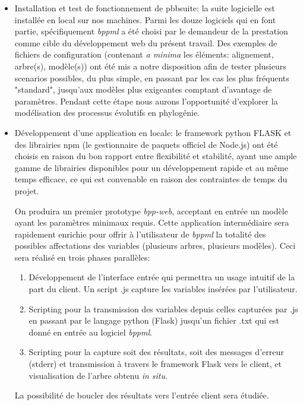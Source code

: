 \begin{itemize}
	\item Installation et test de fonctionnement de pbbsuite: la suite logicielle est installée en local sur nos machines. 
	Parmi les douze logiciels qui en font partie, spécifiquement   \textit{bppml} a été choisi par le demandeur de la prestation comme cible 
	du développement web du présent travail. Des exemples de fichiers de configuration (contenant \textit{a minima} les éléments: alignement, arbre(s), modèle(s)) 
	ont été mis a notre disposition  
	afin de tester plusieurs scenarios possibles, du plus simple, en passant par les cas les plus fréquents "standard", 
	jusqu'aux modèles plus exigeantes comptant d'avantage de paramètres. Pendant cette étape nous aurons l'opportunité d'explorer
	 la modélisation des processus évolutifs en phylogénie.
	
	\item Développement d'une application en locale: le framework python FLASK et des librairies npm
	(le gestionnaire de paquets officiel de Node.js) 
	ont été choisis en raison du bon rapport entre flexibilité et stabilité, 
	ayant une ample gamme de librairies disponibles pour un développement rapide et au même temps efficace, 
	ce qui est convenable en raison des contraintes de temps du projet.

	On produira un premier prototype  \textit{bpp-web}, acceptant en entrée un modèle ayant les paramètres minimaux requis. 
	Cette application intermédiaire sera rapidement enrichie pour offrir à l'utilisateur de \textit{bppml} la totalité des possibles affectations 
	des variables (plusieurs arbres, plusieurs modèles).
	Ceci sera réalisé en trois phases parallèles:
	\begin{enumerate}
		\item Développement de l'interface entrée qui permettra un usage intuitif de la part du client. 
		Un script .js capture les variables insérées par l'utilisateur. 
		\item Scripting pour la transmission des variables depuis celles capturées par .js en passant par le langage 
		python (Flask) jusqu'un fichier .txt qui est donné en entrée au logiciel \textit{bppml}.
		\item Scripting pour la capture soit des résultats, soit des messages d'erreur (stderr) et transmission à travers 
		le framework Flask vers le client, et visualisation de l'arbre obtenu \textit{in situ}. 
	\end{enumerate}
	
	La possibilité de boucler des résultats vers l'entrée client sera étudiée.
	 

\end{itemize}
